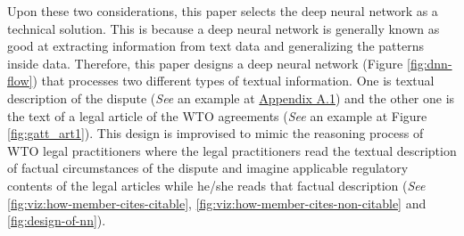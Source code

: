 Upon these two considerations, this paper selects the deep neural network as a technical solution. %
This is because a deep neural network is generally known as good at extracting information from text data and generalizing the patterns inside data. 
Therefore, this paper designs a deep neural network (Figure \ref{fig:dnn-flow}) that
processes two different types of textual information.
One is textual description of the dispute (\textit{See} an example at \hyperref[sub:factual-aspect-example]{Appendix A.1}) and
the other one is the text of a legal article of the WTO agreements (\textit{See} an example at Figure \ref{fig:gatt_art1}).
This design is improvised to mimic
the reasoning process of WTO legal practitioners
where the legal practitioners read
the textual description of
factual circumstances of the dispute and imagine applicable regulatory contents of
the legal articles while he/she reads that factual description (\textit{See} \ref{fig:viz:how-member-cites-citable}, \ref{fig:viz:how-member-cites-non-citable} and \ref{fig:design-of-nn}).






